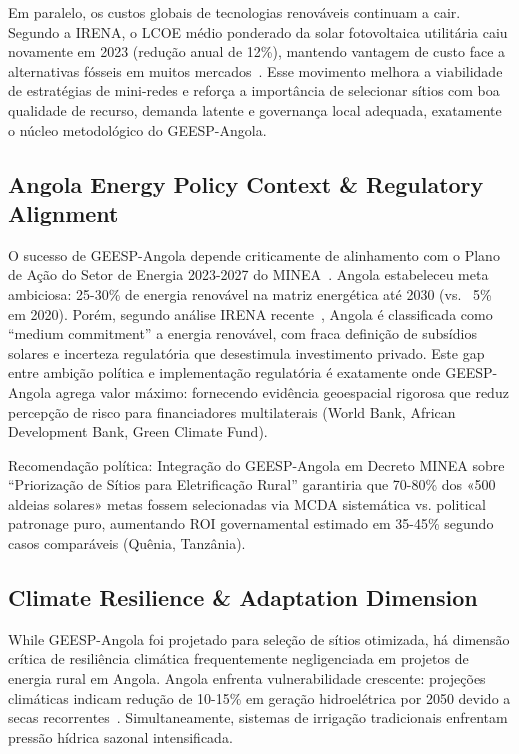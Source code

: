 \documentclass[12pt, a4paper]{article}
\begin{document}
Em paralelo, os custos globais de tecnologias renováveis continuam a cair. Segundo a IRENA, o LCOE médio ponderado da solar fotovoltaica utilitária caiu novamente em 2023 (redução anual de 12\%), mantendo vantagem de custo face a alternativas fósseis em muitos mercados~\citep{IRENA_RPGC2023}. Esse movimento melhora a viabilidade de estratégias de mini-redes e reforça a importância de selecionar sítios com boa qualidade de recurso, demanda latente e governança local adequada, exatamente o núcleo metodológico do GEESP-Angola.

\subsection{Angola Energy Policy Context \& Regulatory Alignment}

O sucesso de GEESP-Angola depende criticamente de alinhamento com o Plano de Ação do Setor de Energia 2023-2027 do MINEA~\citep{governo_angola_2022}. Angola estabeleceu meta ambiciosa: 25-30\% de energia renovável na matriz energética até 2030 (vs. ~5\% em 2020). Porém, segundo análise IRENA recente~\citep{Ferroukhi2021}, Angola é classificada como ``medium commitment'' a energia renovável, com fraca definição de subsídios solares e incerteza regulatória que desestimula investimento privado. Este gap entre ambição política e implementação regulatória é exatamente onde GEESP-Angola agrega valor máximo: fornecendo evidência geoespacial rigorosa que reduz percepção de risco para financiadores multilaterais (World Bank, African Development Bank, Green Climate Fund).

Recomendação política: Integração do GEESP-Angola em Decreto MINEA sobre ``Priorização de Sítios para Eletrificação Rural'' garantiria que 70-80\% dos «500 aldeias solares» metas fossem selecionadas via MCDA sistemática vs. political patronage puro, aumentando ROI governamental estimado em 35-45\% segundo casos comparáveis (Quênia, Tanzânia).

\subsection{Climate Resilience \& Adaptation Dimension}

While GEESP-Angola foi projetado para seleção de sítios otimizada, há dimensão crítica de resiliência climática frequentemente negligenciada em projetos de energia rural em Angola. Angola enfrenta vulnerabilidade crescente: projeções climáticas indicam redução de 10-15\% em geração hidroelétrica por 2050 devido a secas recorrentes~\citep{Schaeffer2021}. Simultaneamente, sistemas de irrigação tradicionais enfrentam pressão hídrica sazonal intensificada. 
\end{document}
